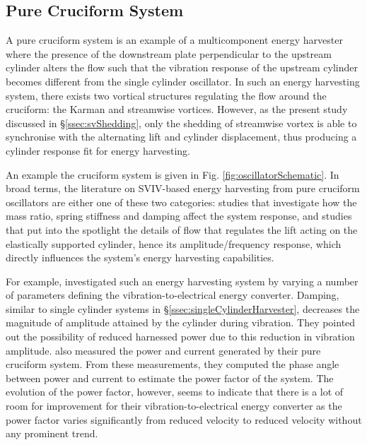 \documentclass[oneside]{utmthesis}
\begin{document}
\subsection{Pure Cruciform System} \label{ssec:pureCruciformHarvester}
A pure cruciform \citep{Zou2021} system  is an example of a multicomponent energy harvester where the presence of the downstream plate perpendicular to the upstream cylinder alters the flow such that the vibration response of the upstream cylinder becomes different from the single cylinder oscillator. In such an energy harvesting system, there exists two vortical structures regulating the flow around the cruciform: the Karman and streamwise vortices. However, as the present study discussed in \S\ref{ssec:svShedding}, only the shedding of streamwise vortex is able to synchronise with the alternating lift and cylinder displacement, thus producing a cylinder response fit for energy harvesting.

An example the cruciform system is given in Fig. \ref{fig:oscillatorSchematic}. In broad terms, the literature on SVIV-based energy harvesting from pure cruciform oscillators are either one of these two categories: studies that investigate how the mass ratio, spring stiffness and damping affect the system response, and studies that put into the spotlight the details of flow that regulates the lift acting on the elastically supported cylinder, hence its amplitude/frequency response, which directly influences the system's energy harvesting capabilities.

For example, \citet{Koide2009} investigated such an energy harvesting system by varying a number of parameters defining the vibration-to-electrical energy converter. Damping, similar to single cylinder systems in \S\ref{ssec:singleCylinderHarvester}, decreases the magnitude of amplitude attained by the cylinder during vibration. They pointed out the possibility of reduced harnessed power due to this reduction in vibration amplitude. \citet{Koide2009} also measured the power and current generated by their pure cruciform system. From these measurements, they computed the phase angle between power and current to estimate the power factor of the system. The evolution of the power factor, however, seems to indicate that there is a lot of room for improvement for their vibration-to-electrical energy converter as the power factor varies significantly from reduced velocity to reduced velocity without any prominent trend.
\end{document}
